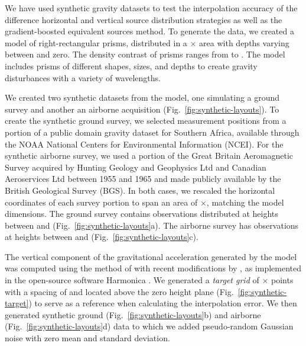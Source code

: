 We have used synthetic gravity datasets to test the interpolation accuracy of
the difference horizontal and vertical source distribution strategies as well
as the gradient-boosted equivalent sources method.
To generate the data, we created a model of \NPrisms{} right-rectangular
prisms,
distributed in a \ModelEasting{}$\times$\ModelNorthing{} area with depths
varying between \ModelDepth{} and zero.
The density contrast of prisms ranges from \ModelMinDensity{} to
\ModelMaxDensity{}.
The model includes prisms of different shapes, sizes, and depths to create
gravity disturbances with a variety of wavelengths.

We created two synthetic datasets from the model, one simulating a ground
survey and another an airborne acquisition (Fig.~\ref{fig:synthetic-layouts}).
To create the synthetic ground survey, we selected measurement positions from a
portion of a public domain gravity dataset for Southern Africa, available
through the NOAA National Centers for Environmental Information (NCEI).
For the synthetic airborne survey, we used a portion of the Great Britain
Aeromagnetic Survey acquired by Hunting Geology and Geophysics Ltd and Canadian
Aeroservices Ltd between 1955 and 1965 and made publicly available by the
British Geological Survey (BGS).
In both cases, we rescaled the horizontal coordinates of each survey portion to
span an area of \SurveyEasting{}$\times$\SurveyNorthing{}, matching the model
dimensions.
The ground survey contains \GroundSurveyPoints{} observations distributed at
heights between \GroundSurveyMinHeight{} and \GroundSurveyMaxHeight{}
(Fig.~\ref{fig:synthetic-layouts}a).
The airborne survey has \AirborneSurveyPoints{} observations at heights between
\AirborneSurveyMinHeight{} and \AirborneSurveyMaxHeight{}
(Fig.~\ref{fig:synthetic-layouts}c).

The vertical component of the gravitational acceleration generated by the
model was computed  using the method of \citet{nagy2000, nagy2002}
with recent modifications by \citet{fukushima2020},
as implemented in the open-source software Harmonica \citep{harmonica2020}.
We generated a \emph{target grid} of
\TargetEastingSize{}$\times$\TargetNorthingSize{} points with a spacing of
\TargetSpacing{} and located \TargetHeight{} above the zero height plane
(Fig.~\ref{fig:synthetic-target}) to serve as a reference when calculating the
interpolation error.
We then generated synthetic ground (Fig.~\ref{fig:synthetic-layouts}b) and
airborne (Fig.~\ref{fig:synthetic-layouts}d) data to which we added
pseudo-random Gaussian noise with zero mean and \SurveyNoise{} standard
deviation.


